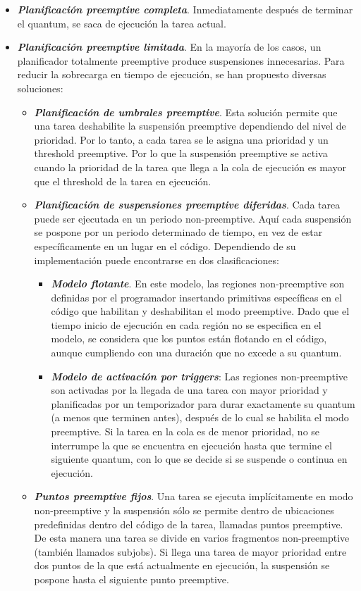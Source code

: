 \begin{itemize}
\item \textbf{\textit{Planificación preemptive completa}}. Inmediatamente después de terminar el quantum, se saca de ejecución la tarea actual.
\item \textbf{\textit{Planificación preemptive limitada}}. En la mayoría de los casos, un planificador totalmente preemptive produce suspensiones innecesarias. Para reducir la sobrecarga en tiempo de ejecución, se han propuesto diversas soluciones\cite{Buttazzo2013}:
    \begin{itemize}
    \item \textbf{\textit{Planificación de umbrales preemptive}}.
Esta solución permite que una tarea deshabilite la suspensión preemptive dependiendo del nivel de prioridad. Por lo tanto, a cada tarea se le asigna una prioridad y un threshold preemptive. Por lo que la suspensión preemptive se activa cuando la prioridad de la tarea que llega a la cola de ejecución es mayor que el  threshold de la tarea en ejecución.
    \item \textbf{\textit{Planificación de suspensiones preemptive diferidas}}.
    Cada tarea puede ser ejecutada en un periodo non-preemptive. Aquí cada suspensión se pospone por un periodo determinado de tiempo, en vez de estar específicamente en un lugar en el código. Dependiendo de su implementación puede encontrarse en dos clasificaciones:
        \begin{itemize}
        \item \textbf{\textit{Modelo flotante}}. En este modelo, las regiones non-preemptive son definidas por el programador insertando primitivas específicas en el código que habilitan y deshabilitan el modo preemptive. Dado que el tiempo inicio de ejecución en cada región no se especifica en el modelo, se considera que los puntos están flotando en el código, aunque cumpliendo con una duración que no excede a su quantum.
       
        \item \textbf{\textit{Modelo de activación por triggers}}: Las regiones non-preemptive son activadas por la llegada de una tarea con mayor prioridad y planificadas por un temporizador para durar exactamente su quantum (a menos que terminen antes), después de lo cual se habilita el modo preemptive. Si la tarea en la cola es de menor prioridad, no se interrumpe la que se encuentra en ejecución hasta que termine el siguiente quantum, con lo que se decide si se suspende o continua en ejecución.
        \end{itemize}
    \item \textbf{\textit{Puntos preemptive fijos}}. Una tarea se ejecuta implícitamente en modo non-preemptive y la suspensión sólo se permite dentro de ubicaciones predefinidas dentro del código de la tarea, llamadas puntos preemptive. De esta manera una tarea se divide en varios fragmentos non-preemptive (también llamados subjobs). Si llega una tarea de mayor prioridad entre dos puntos de la que está actualmente en ejecución, la suspensión se pospone hasta el siguiente punto preemptive. 
    \end{itemize}
\end{itemize}


